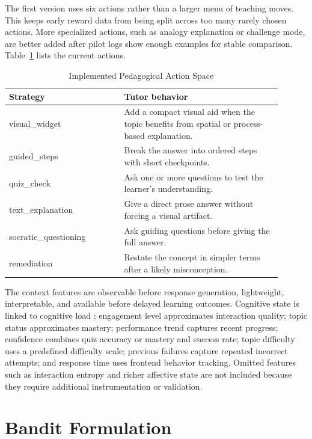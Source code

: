 \documentclass[conference]{IEEEtran}
\begin{document}
The first version uses six actions rather than a larger menu of teaching moves. This keeps early reward data from being split across too many rarely chosen actions. More specialized actions, such as analogy explanation or challenge mode, are better added after pilot logs show enough examples for stable comparison. Table~\ref{tab:actions} lists the current actions.

\begin{table}[htbp]
\caption{Implemented Pedagogical Action Space}
\label{tab:actions}
\centering
\begin{tabular}{>{\raggedright\arraybackslash}p{0.38\linewidth}>{\raggedright\arraybackslash}p{0.52\linewidth}}
\toprule
\textbf{Strategy} & \textbf{Tutor behavior} \\
\midrule
visual\_widget & Add a compact visual aid when the topic benefits from spatial or process-based explanation. \\
guided\_steps & Break the answer into ordered steps with short checkpoints. \\
quiz\_check & Ask one or more questions to test the learner's understanding. \\
text\_explanation & Give a direct prose answer without forcing a visual artifact. \\
socratic\_questioning & Ask guiding questions before giving the full answer. \\
remediation & Restate the concept in simpler terms after a likely misconception. \\
\bottomrule
\end{tabular}
\end{table}

The context features are observable before response generation, lightweight, interpretable, and available before delayed learning outcomes. Cognitive state is linked to cognitive load ; engagement level approximates interaction quality; topic status approximates mastery; performance trend captures recent progress; confidence combines quiz accuracy or mastery and success rate; topic difficulty uses a predefined difficulty scale; previous failures capture repeated incorrect attempts; and response time uses frontend behavior tracking. Omitted features such as interaction entropy and richer affective state are not included because they require additional instrumentation or validation.

\section{Bandit Formulation}
\end{document}
